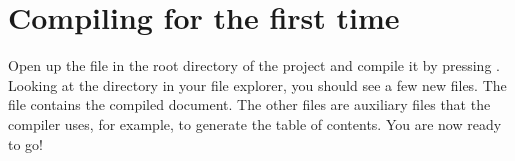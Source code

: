 %

\section*{Compiling for the first time}
Open up the file  in the root directory of the project and compile it by pressing \faForward. 
Looking at the directory in your file explorer, you should see a few new files.
The  file contains the compiled document.
The other files are auxiliary files that the compiler uses, for example, to generate the table of contents.
You are now ready to go!

\newpage
\nopagecolor
